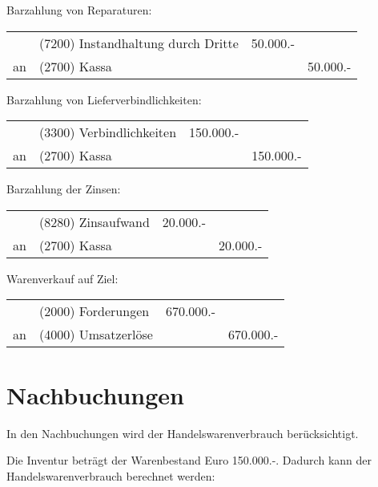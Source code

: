 \documentclass[parskip=half,12pt,a4paper]{scrartcl}
\begin{document}
Barzahlung von Reparaturen:

\begin{center}
	\begin{tabularx}{\textwidth}{rXrr}
		\toprule
		& (7200) Instandhaltung durch Dritte & 50.000.- &\\
		an & (2700) Kassa & & 50.000.-\\
		\bottomrule
	\end{tabularx}
\end{center}

Barzahlung von Lieferverbindlichkeiten:

\begin{center}
	\begin{tabularx}{\textwidth}{rXrr}
		\toprule
		& (3300) Verbindlichkeiten & 150.000.- &\\
		an & (2700) Kassa & & 150.000.-\\
		\bottomrule
	\end{tabularx}
\end{center}

Barzahlung der Zinsen:

\begin{center}
	\begin{tabularx}{\textwidth}{rXrr}
		\toprule
		& (8280) Zinsaufwand & 20.000.- &\\
		an & (2700) Kassa & & 20.000.-\\
		\bottomrule
	\end{tabularx}
\end{center}

Warenverkauf auf Ziel:

\begin{center}
	\begin{tabularx}{\textwidth}{rXrr}
		\toprule
		& (2000) Forderungen & 670.000.- &\\
		an & (4000) Umsatzerlöse & & 670.000.-\\
		\bottomrule
	\end{tabularx}
\end{center}

\section{Nachbuchungen}

In den Nachbuchungen wird der Handelswarenverbrauch berücksichtigt.

Die Inventur beträgt der Warenbestand Euro 150.000.-. Dadurch kann der Handelswarenverbrauch berechnet werden:
\end{document}
